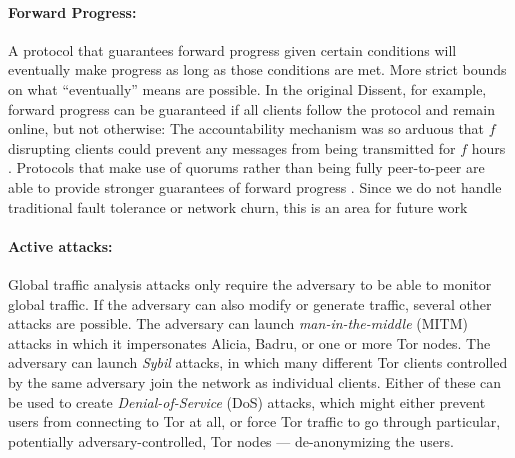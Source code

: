   \paragraph{Forward Progress:} A protocol that guarantees forward progress
  given certain conditions will eventually make progress as long as those
  conditions are met. More strict bounds on what ``eventually'' means are
  possible. In the original Dissent, for example, forward progress can be
  guaranteed if all clients follow the protocol and remain online, but not
  otherwise: The accountability mechanism was so arduous that $f$ disrupting
  clients could prevent any messages from being transmitted for $f$ hours
  \cite{verdict}. Protocols that make use of quorums
  rather than being fully peer-to-peer are able to provide stronger guarantees
  of forward progress \cite{paxos}. Since we do not handle traditional fault
  tolerance or network churn,  this is an area
  for future work 
  \paragraph{Active attacks:}
  Global traffic analysis attacks only require the adversary to be able to
  monitor global traffic. If the adversary can also modify or generate
  traffic, several other attacks are possible. The adversary can launch
  \emph{man-in-the-middle} (MITM) attacks in which it impersonates Alicia,
  Badru, or one or more Tor nodes. The adversary can launch \emph{Sybil}
  attacks, in which many different Tor clients controlled by the same
  adversary join the network as individual clients. Either of these can be
  used to create \emph{Denial-of-Service} (DoS) attacks, which might either
  prevent users from connecting to Tor at all, or force Tor traffic to go
  through particular, potentially adversary-controlled, Tor nodes ---
  de-anonymizing the users.
